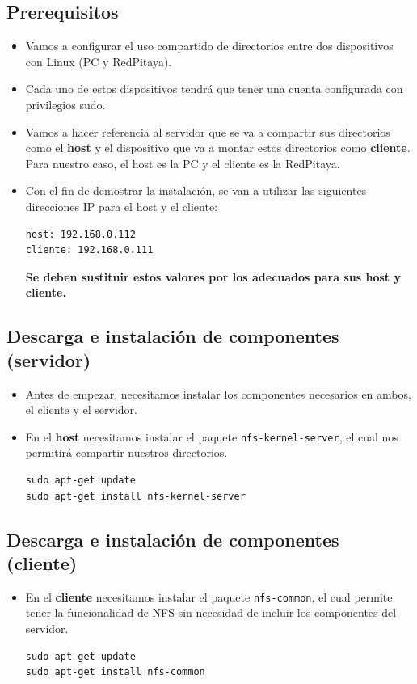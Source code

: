 \documentclass[a4paper,11pt]{article}
\begin{document}
\subsection{Prerequisitos}
\begin{itemize}
  \item Vamos a configurar el uso compartido de directorios entre dos
        dispositivos con Linux (PC y RedPitaya).
  \item Cada uno de estos dispositivos tendrá que tener una cuenta
        configurada con privilegios sudo.
  \item Vamos a hacer referencia al servidor que se va a compartir sus
        directorios como el \textbf{host} y el dispositivo que va a montar estos
        directorios como \textbf{cliente}. Para nuestro caso, el host es la PC y
        el cliente es la RedPitaya.
  \item Con el fin de demostrar la instalación, se van a utilizar las
        siguientes direcciones IP para el host y el cliente:
\begin{verbatim}
host: 192.168.0.112 
cliente: 192.168.0.111
\end{verbatim}
        \textbf{Se deben sustituir estos valores por los adecuados para sus
        host y cliente.}
\end{itemize}

\subsection{Descarga e instalación de componentes (servidor)}
\begin{itemize}
\item Antes de empezar, necesitamos instalar los componentes necesarios en
      ambos, el cliente y el servidor.
\item En el \textbf{host} necesitamos instalar el paquete
\texttt{nfs-kernel-server}, el cual nos permitirá compartir nuestros
directorios.
\begin{verbatim}
sudo apt-get update
sudo apt-get install nfs-kernel-server
\end{verbatim}
\end{itemize}

\subsection{Descarga e instalación de componentes (cliente)}
\begin{itemize}
\item En el \textbf{cliente} necesitamos instalar el paquete
            \texttt{nfs-common}, el cual permite tener la funcionalidad de NFS
            sin necesidad de incluir los componentes del servidor.
\begin{verbatim}
sudo apt-get update
sudo apt-get install nfs-common

\end{verbatim}
\end{itemize}
\end{document}
